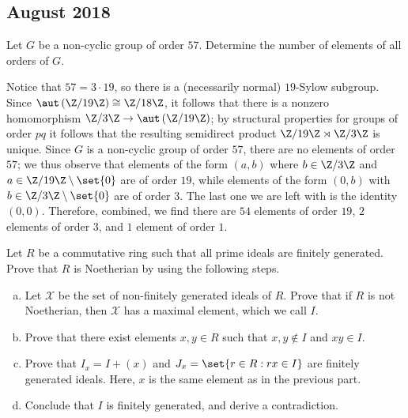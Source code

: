 \documentclass[10pt]{mypackage}
\begin{document}
\subsection{August 2018}%
\begin{problem}[Problem 2]
  Let $G$ be a non-cyclic group of order $57$. Determine the number of elements of all orders of $G$.
\end{problem}
\begin{solution}
  Notice that $57 = 3\cdot 19$, so there is a (necessarily normal) $19$-Sylow subgroup. Since $\aut\left( \Z/19\Z \right)\cong \Z/18\Z$, it follows that there is a nonzero homomorphism $\Z/3\Z\rightarrow \aut\left( \Z/19\Z \right)$; by structural properties for groups of order $pq$ it follows that the resulting semidirect product $\Z/19\Z\rtimes \Z/3\Z$ is unique. Since $G$ is a non-cyclic group of order $57$, there are no elements of order $57$; we thus observe that elements of the form $\left( a,b \right)$ where $b\in \Z/3\Z$ and $a\in \Z/19\Z\setminus \set{0}$ are of order $19$, while elements of the form $\left( 0,b \right)$ with $b\in \Z/3\Z\setminus \set{0}$ are of order $3$. The last one we are left with is the identity $\left( 0,0 \right)$. Therefore, combined, we find there are $54$ elements of order $19$, $2$ elements of order $3$, and $1$ element of order $1$.
\end{solution}
\begin{problem}[Problem 3]
  Let $R$ be a commutative ring such that all prime ideals are finitely generated. Prove that $R$ is Noetherian by using the following steps.
  \begin{enumerate}[(a)]
    \item Let $\mathcal{X}$ be the set of non-finitely generated ideals of $R$. Prove that if $R$ is not Noetherian, then $ \mathcal{X} $ has a maximal element, which we call $I$.
    \item Prove that there exist elements $x,y\in R$ such that $x,y\notin I$ and $xy\in I$.
    \item Prove that $I_x = I + \left( x \right)$ and $J_x = \set{r\in R : rx\in I}$ are finitely generated ideals. Here, $x$ is the same element as in the previous part.
    \item Conclude that $I$ is finitely generated, and derive a contradiction.
  \end{enumerate}
\end{problem}
\end{document}
